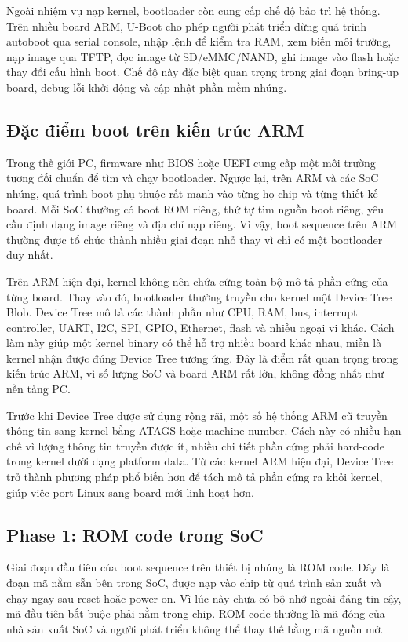 \documentclass[11pt]{article}
\begin{document}
Ngoài nhiệm vụ nạp kernel, bootloader còn cung cấp chế độ bảo trì hệ thống. Trên nhiều board ARM, U-Boot cho phép người phát triển dừng quá trình autoboot qua serial console, nhập lệnh để kiểm tra RAM, xem biến môi trường, nạp image qua TFTP, đọc image từ SD/eMMC/NAND, ghi image vào flash hoặc thay đổi cấu hình boot. Chế độ này đặc biệt quan trọng trong giai đoạn bring-up board, debug lỗi khởi động và cập nhật phần mềm nhúng.

\subsection{Đặc điểm boot trên kiến trúc ARM}

Trong thế giới PC, firmware như BIOS hoặc UEFI cung cấp một môi trường tương đối chuẩn để tìm và chạy bootloader. Ngược lại, trên ARM và các SoC nhúng, quá trình boot phụ thuộc rất mạnh vào từng họ chip và từng thiết kế board. Mỗi SoC thường có boot ROM riêng, thứ tự tìm nguồn boot riêng, yêu cầu định dạng image riêng và địa chỉ nạp riêng. Vì vậy, boot sequence trên ARM thường được tổ chức thành nhiều giai đoạn nhỏ thay vì chỉ có một bootloader duy nhất.

Trên ARM hiện đại, kernel không nên chứa cứng toàn bộ mô tả phần cứng của từng board. Thay vào đó, bootloader thường truyền cho kernel một Device Tree Blob. Device Tree mô tả các thành phần như CPU, RAM, bus, interrupt controller, UART, I2C, SPI, GPIO, Ethernet, flash và nhiều ngoại vi khác. Cách làm này giúp một kernel binary có thể hỗ trợ nhiều board khác nhau, miễn là kernel nhận được đúng Device Tree tương ứng. Đây là điểm rất quan trọng trong kiến trúc ARM, vì số lượng SoC và board ARM rất lớn, không đồng nhất như nền tảng PC.

Trước khi Device Tree được sử dụng rộng rãi, một số hệ thống ARM cũ truyền thông tin sang kernel bằng ATAGS hoặc machine number. Cách này có nhiều hạn chế vì lượng thông tin truyền được ít, nhiều chi tiết phần cứng phải hard-code trong kernel dưới dạng platform data. Từ các kernel ARM hiện đại, Device Tree trở thành phương pháp phổ biến hơn để tách mô tả phần cứng ra khỏi kernel, giúp việc port Linux sang board mới linh hoạt hơn.

\subsection{Phase 1: ROM code trong SoC}

Giai đoạn đầu tiên của boot sequence trên thiết bị nhúng là ROM code. Đây là đoạn mã nằm sẵn bên trong SoC, được nạp vào chip từ quá trình sản xuất và chạy ngay sau reset hoặc power-on. Vì lúc này chưa có bộ nhớ ngoài đáng tin cậy, mã đầu tiên bắt buộc phải nằm trong chip. ROM code thường là mã đóng của nhà sản xuất SoC và người phát triển không thể thay thế bằng mã nguồn mở.
\end{document}
